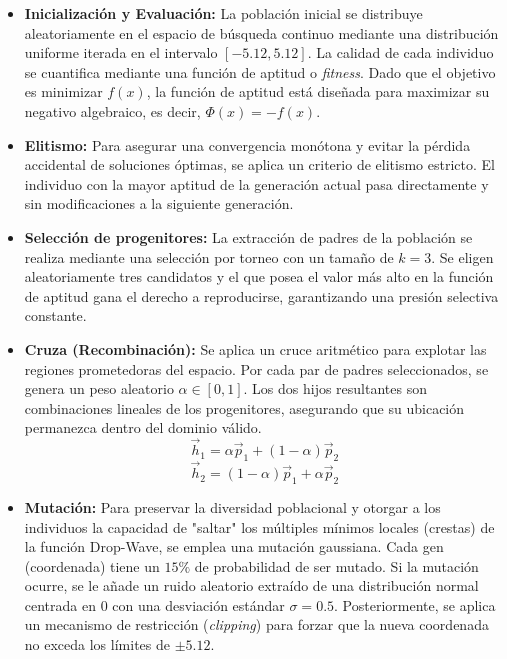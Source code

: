 \begin{itemize}
    \item \textbf{Inicialización y Evaluación:} La población inicial se distribuye aleatoriamente en el espacio de búsqueda continuo mediante una distribución uniforme
        iterada en el intervalo $[-5.12, 5.12]$. La calidad de cada individuo se cuantifica mediante una función de aptitud o \textit{fitness}. Dado que el objetivo es
        minimizar $f(x)$, la función de aptitud está diseñada para maximizar su negativo algebraico, es decir, $\Phi(x) = -f(x)$.

    \item \textbf{Elitismo:} Para asegurar una convergencia monótona y evitar la pérdida accidental de soluciones óptimas, se aplica un criterio de elitismo estricto.
        El individuo con la mayor aptitud de la generación actual pasa directamente y sin modificaciones a la siguiente generación.

    \item \textbf{Selección de progenitores:} La extracción de padres de la población se realiza mediante una selección por torneo con un tamaño de $k=3$. Se eligen aleatoriamente tres candidatos y el que posea el valor más alto en la función de aptitud gana el derecho a reproducirse, garantizando una presión selectiva constante.

    \item \textbf{Cruza (Recombinación):} Se aplica un cruce aritmético para explotar las regiones prometedoras del espacio. Por cada par de padres seleccionados,
        se genera un peso aleatorio $\alpha \in [0, 1]$. Los dos hijos resultantes son combinaciones lineales de los progenitores, asegurando que su ubicación permanezca
        dentro del dominio válido.
        $$\vec{h}_1 = \alpha \vec{p}_1 + (1 - \alpha)\vec{p}_2$$
        $$\vec{h}_2 = (1 - \alpha)\vec{p}_1 + \alpha \vec{p}_2$$

    \item \textbf{Mutación:} Para preservar la diversidad poblacional y otorgar a los individuos la capacidad de "saltar" los múltiples mínimos locales (crestas)
        de la función Drop-Wave, se emplea una mutación gaussiana. Cada gen (coordenada) tiene un $15\%$ de probabilidad de ser mutado. Si la mutación ocurre, se
        le añade un ruido aleatorio extraído de una distribución normal centrada en $0$ con una desviación estándar $\sigma = 0.5$. Posteriormente, se aplica un
        mecanismo de restricción (\textit{clipping}) para forzar que la nueva coordenada no exceda los límites de $\pm 5.12$.
\end{itemize}

